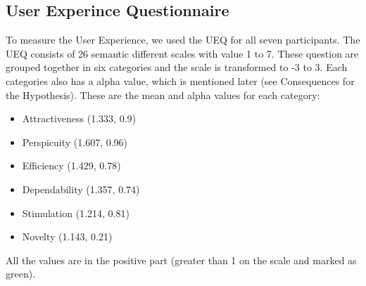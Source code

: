 \documentclass{sigchi}
\begin{document}
\subsection{User Experince Questionnaire}
To measure the User Experience, we used the UEQ for all seven participants. The UEQ consists of 26 semantic different scales with value 1 to 7. These question are grouped together in six categories and the scale is transformed to -3 to 3.
Each categories also has a alpha value, which is mentioned later (see Consequences for the Hypothesis).
These are the mean and alpha values for each category:
\begin{itemize}
\item Attractiveness (1.333, 0.9)
\item Perspicuity (1.607, 0.96)
\item Efficiency (1.429, 0.78)
\item Dependability (1.357, 0.74)
\item Stimulation (1.214, 0.81)
\item Novelty (1.143, 0.21)
\end{itemize}
All the values are in the positive part (greater than 1 on the scale and marked as green).
\end{document}
